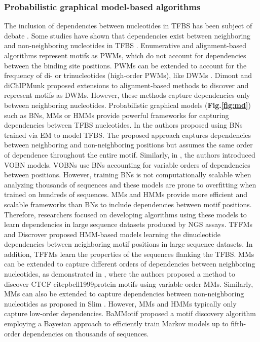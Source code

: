 \documentclass[a4paper, titlepage, openright]{book}
\begin{document}
\subsubsection{Probabilistic graphical model-based algorithms}
The inclusion of dependencies between nucleotides in TFBS has been subject of debate \citep{tomovic2007position, morris2011jury, zhao2011quantitative}.  Some studies have shown that dependencies exist between neighboring and non-neighboring nucleotides in TFBS \citep{slattery2014absence, rohs2010origins}. Enumerative and alignment-based algorithms represent motifs as PWMs, which do not account for dependencies between the binding site positions. PWMs can be extended to account for the frequency of di- or trinucleotides (high-order PWMs), like DWMs \citep{siddharthan2010dinucleotide}. Dimont \citep{grau2013general} and diChIPMunk \citep{kulakovskiy2013binding} proposed extensions to alignment-based methods to discover and represent motifs as DWMs. However, these methods capture dependencies only between neighboring nucleotides. Probabilistic graphical models (\textbf{Fig.\ref{fig:md}}) such as BNs, MMs or HMMs provide powerful frameworks for capturing dependencies between TFBS nucleotides. In \citep{barash2003modeling} the authors proposed using BNs trained via EM to model TFBS. The proposed approach captures dependencies between neighboring and non-neighboring positions but assumes the same order of dependence throughout the entire motif. Similarly, in \citep{ben2005identification}, the authors introduced VOBN models. VOBNs use BNs accounting for variable orders of dependencies between positions. However, training BNs is not computationally scalable when analyzing thousands of sequences and these models are prone to overfitting when trained on hundreds of sequences. MMs and HMMs provide more efficient and scalable frameworks than BNs to include dependencies between motif positions. Therefore, researchers focused on developing algorithms using these models to learn dependencies in large sequence datasets produced by NGS assays. TFFMs \citep{mathelier2013next}  and Discrover \citep{maaskola2014binding} proposed HMM-based models learning the dinucleotide dependencies between neighboring motif positions in large sequence datasets. In addition, TFFMs learn the properties of the sequences flanking the TFBS. MMs can be extended to capture different orders of dependencies between neighboring nucleotides, as demonstrated in \citep{eggeling2014value}, where the authors proposed a method to discover CTCF citep{bell1999protein} motifs using variable-order MMs. Similarly, MMs can also be extended to capture dependencies between non-neighboring nucleotides as proposed in Slim \citep{keilwagen2015varying}. However, MMs and HMMs typically only capture low-order dependencies. BaMMotif  \citep{siebert2016bayesian, ge2021bayesian} proposed a motif discovery algorithm employing a Bayesian approach to efficiently train Markov models up to fifth-order dependencies on thousands of sequences.
\end{document}
